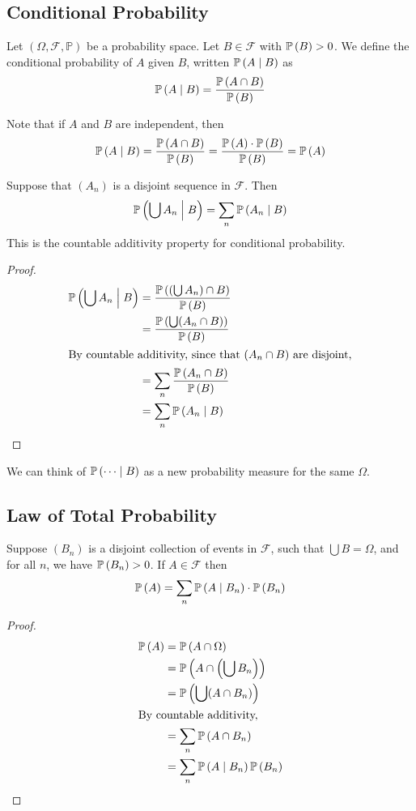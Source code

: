 \subsection{Conditional Probability}
\begin{definition}
	Let \((\Omega, \mathcal F, \mathbb P)\) be a probability space.
	Let \(B \in \mathcal F\) with \(\mathbb{P}\left({B}\right) > 0\).
	We define the conditional probability of \(A\) given \(B\), written \(\mathbb{P}\left({A \mid B}\right)\) as
	\[
		\mathbb{P}\left({A \mid B}\right) = \frac{\mathbb{P}\left({A \cap B}\right)}{\mathbb{P}\left({B}\right)}
	\]
\end{definition}
\noindent Note that if \(A\) and \(B\) are independent, then
\[
	\mathbb{P}\left({A \mid B}\right) = \frac{\mathbb{P}\left({A \cap B}\right)}{\mathbb{P}\left({B}\right)} = \frac{\mathbb{P}\left({A}\right) \cdot \mathbb{P}\left({B}\right)}{\mathbb{P}\left({B}\right)} = \mathbb{P}\left({A}\right)
\]
\begin{claim}
	Suppose that \((A_n)\) is a disjoint sequence in \(\mathcal F\).
	Then
	\[
		\mathbb{P}\left({\bigcup A_n \mathrel{\Big|} B}\right) = \sum_{n} \mathbb{P}\left({A_n \mid B}\right)
	\]
	This is the countable additivity property for conditional probability.
\end{claim}
\begin{proof}
	\begin{align*}
		\mathbb{P}\left({\bigcup A_n \mathrel{\Big|} B}\right) & = \frac{\mathbb{P}\left({(\bigcup A_n) \cap B}\right)}{\mathbb{P}\left({B}\right)} \\
		                                     & = \frac{\mathbb{P}\left({\bigcup (A_n \cap B)}\right)}{\mathbb{P}\left({B}\right)} \\
		\intertext{By countable additivity, since that \((A_n \cap B)\) are disjoint,}
		                                     & = \sum_n \frac{\mathbb{P}\left({A_n \cap B}\right)}{\mathbb{P}\left({B}\right)}    \\
		                                     & = \sum_n \mathbb{P}\left({A_n \mid B}\right)
	\end{align*}
\end{proof}
\noindent We can think of \(\mathbb{P}\left({\dots \mid B}\right)\) as a new probability measure for the same \(\Omega\).

\subsection{Law of Total Probability}
\begin{claim}
	Suppose \((B_n)\) is a disjoint collection of events in \(\mathcal F\), such that \(\bigcup B = \Omega\), and for all \(n\), we have \(\mathbb{P}\left({B_n}\right) > 0\).
	If \(A \in \mathcal F\) then
	\[
		\mathbb{P}\left({A}\right) = \sum_n \mathbb{P}\left({A \mid B_n}\right) \cdot \mathbb{P}\left({B_n}\right)
	\]
\end{claim}
\begin{proof}
	\begin{align*}
		\mathbb{P}\left({A}\right) & = \mathbb{P}\left({A \cap \Omega}\right)                   \\
		         & = \mathbb{P}\left({A \cap \left(\bigcup B_n\right)}\right) \\
		         & = \mathbb{P}\left({\bigcup(A \cap B_n)}\right)             \\
		\intertext{By countable additivity,}
		         & = \sum_n \mathbb{P}\left({A \cap B_n}\right)               \\
		         & = \sum_n \mathbb{P}\left({A \mid B_n}\right) \mathbb{P}\left({B_n}\right)
	\end{align*}
\end{proof}

